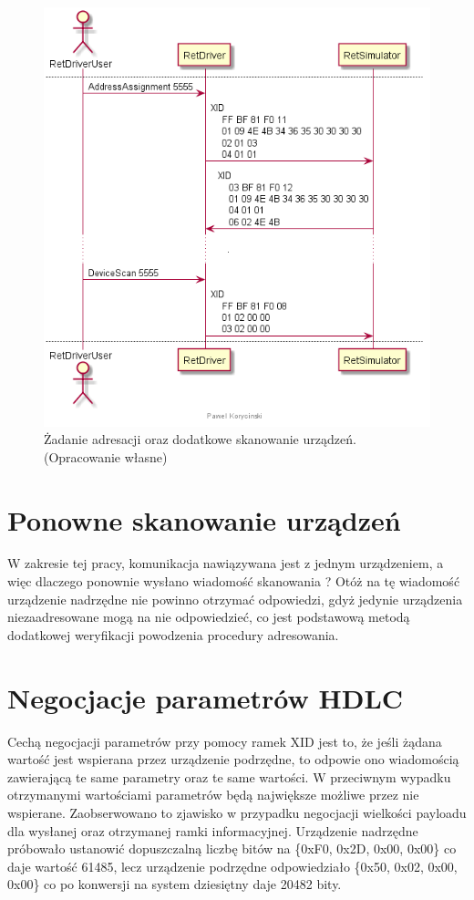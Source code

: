     \begin{figure}[h!]
    \centering
    \includegraphics[scale=0.75]{out/Diagramy/UML_DiagramOfSequence_New/KalibracjaRETa-page2.png}
    \caption{Żadanie adresacji oraz dodatkowe skanowanie urządzeń.
        \newline(Opracowanie własne)}
    \end{figure}

    \section{Ponowne skanowanie urządzeń}
    W zakresie tej pracy, komunikacja nawiązywana jest z jednym urządzeniem, a więc dlaczego
    ponownie wysłano wiadomość skanowania ? Otóż na tę wiadomość urządzenie nadrzędne
    nie powinno otrzymać odpowiedzi, gdyż jedynie urządzenia niezaadresowane mogą na nie 
    odpowiedzieć, co jest podstawową metodą dodatkowej weryfikacji powodzenia procedury
    adresowania.

    \section{Negocjacje parametrów HDLC}
    Cechą negocjacji parametrów przy pomocy ramek XID jest to, że jeśli żądana wartość jest wspierana przez
    urządzenie podrzędne, to odpowie ono wiadomością zawierającą te same parametry oraz te same wartości. 
    W przeciwnym wypadku otrzymanymi wartościami parametrów będą największe możliwe przez nie wspierane.
    Zaobserwowano to zjawisko w przypadku negocjacji wielkości payloadu dla wysłanej oraz otrzymanej ramki informacyjnej.
    Urządzenie nadrzędne próbowało ustanowić dopuszczalną liczbę bitów na \{0xF0, 0x2D, 0x00, 0x00\} co daje wartość 61485,
    lecz urządzenie podrzędne odpowiedziało \{0x50, 0x02, 0x00, 0x00\} co po konwersji na system dziesiętny daje 20482 bity.

